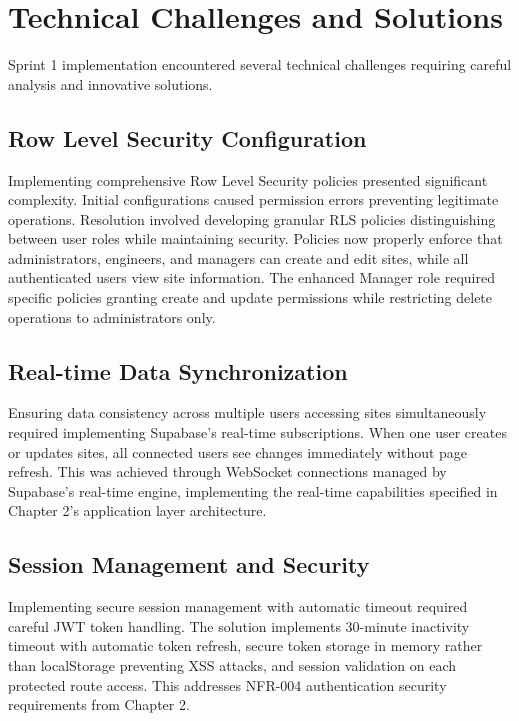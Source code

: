 \section{Technical Challenges and Solutions}

Sprint 1 implementation encountered several technical challenges requiring careful analysis and innovative solutions.

\subsection{Row Level Security Configuration}

Implementing comprehensive Row Level Security policies presented significant complexity. Initial configurations caused permission errors preventing legitimate operations. Resolution involved developing granular RLS policies distinguishing between user roles while maintaining security. Policies now properly enforce that administrators, engineers, and managers can create and edit sites, while all authenticated users view site information. The enhanced Manager role required specific policies granting create and update permissions while restricting delete operations to administrators only.

\subsection{Real-time Data Synchronization}

Ensuring data consistency across multiple users accessing sites simultaneously required implementing Supabase's real-time subscriptions. When one user creates or updates sites, all connected users see changes immediately without page refresh. This was achieved through WebSocket connections managed by Supabase's real-time engine, implementing the real-time capabilities specified in Chapter 2's application layer architecture.

\subsection{Session Management and Security}

Implementing secure session management with automatic timeout required careful JWT token handling. The solution implements 30-minute inactivity timeout with automatic token refresh, secure token storage in memory rather than localStorage preventing XSS attacks, and session validation on each protected route access. This addresses NFR-004 authentication security requirements from Chapter 2.

